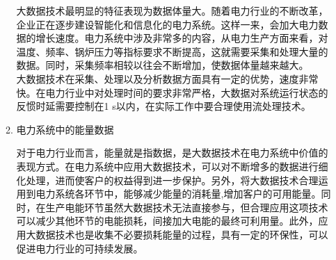 \documentclass{article}
\begin{document}
\begin{enumerate}
\begin{enumerate}
          大数据技术最明显的特征表现为数据体量大。随着电力行业的不断改革，企业正在逐步建设智能化和信息化的电力系统。这样一来，会加大电力数据的增长速度。电力系统中涉及非常多的内容，从电力生产方面来看，对温度、频率、锅炉压力等指标要求不断提高，这就需要采集和处理大量的数据。同时，采集频率相较以往会不断增加，使数据体量越来越大。
          \\ 大数据技术在采集、处理以及分析数据方面具有一定的优势，速度非常快。在电力行业中对处理时间的要求非常严格，大数据对系统运行状态的反惯时延需要控制在1 s以内，在实际工作中要合理使用流处理技术。
          \item 电力系统中的能量数据\par
          对于电力行业而言，能量就是指数据，是大数据技术在电力系统中价值的表现方式。在电力系统中应用大数据技术，可以对不断增多的数据进行细化处理，进而使客户的权益得到进一步保护。另外，将大数据技术合理运用到电力系统各环节中，能够减少能量的消耗量,增加客户的可用能量。同时，在生产电能环节虽然大数据技术无法直接参与，但合理应用这项技术可以减少其他环节的电能损耗，间接加大电能的最终可利用量。此外，应用大数据技术也是收集不必要损耗能量的过程，具有一定的环保性，可以促进电力行业的可持续发展。

      \end{enumerate}


\end{enumerate}
\end{document}
